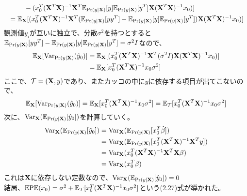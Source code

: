 \documentclass{jsarticle}
\begin{document}
\begin{enumerate}
\begin{align*}
&\ \ \ \ \ \ \ -(x_0^T ({\bf X}^T{\bf X})^{-1}{\bf X}^T\mathbb{E}_{\Pr(y|{\bf X})}[y]\mathbb{E}_{\Pr(y|{\bf X})}[y^T]{\bf X}({\bf X}^T{\bf X})^{-1}x_0)]\\
&=\mathbb{E}_{{\bf X}}[(x_0^T ({\bf X}^T{\bf X})^{-1}{\bf X}^T(\mathbb{E}_{\Pr(y|{\bf X})}[yy^T]-\mathbb{E}_{\Pr(y|{\bf X})}[y]\mathbb{E}_{\Pr(y|{\bf X})}[y^T]){\bf X}({\bf X}^T{\bf X})^{-1}x_0)]
\end{align*}
観測値$y_i$が互いに独立で、分散$\sigma^2$を持つとすると$\mathbb{E}_{\Pr(y|{\bf X})}[yy^T]-\mathbb{E}_{\Pr(y|{\bf X})}[y]\mathbb{E}_{\Pr(y|{\bf X})}[y^T]=\sigma^2 I$なので、
\begin{align*}
\mathbb{E}_{{\bf X}}[{\rm Var}_{\Pr(y|{\bf X})}(\hat{y}_0)]&=\mathbb{E}_{{\bf X}}[(x_0^T ({\bf X}^T{\bf X})^{-1}{\bf X}^T(\sigma^2 I){\bf X}({\bf X}^T{\bf X})^{-1}x_0)]\\
&=\mathbb{E}_{{\bf X}}[x_0^T ({\bf X}^T{\bf X})^{-1}x_0\sigma^2]
\end{align*}
ここで、${\cal T}=({\bf X},y)$であり、またカッコの中に$y$に依存する項目が出てこないので、
\[\mathbb{E}_{{\bf X}}[{\rm Var}_{\Pr(y|{\bf X})}(\hat{y}_0)]=\mathbb{E}_{{\bf X}}[x_0^T ({\bf X}^T{\bf X})^{-1}x_0\sigma^2]=\mathbb{E}_{\cal T}[x_0^T ({\bf X}^T{\bf X})^{-1}x_0\sigma^2]\]
次に、${\rm Var}_{{\bf X}}(\mathbb{E}_{\Pr(y|{\bf X})}[\hat{y}_0])$を計算していく。
\begin{align*}
{\rm Var}_{{\bf X}}(\mathbb{E}_{\Pr(y|{\bf X})}[\hat{y}_0])&={\rm Var}_{{\bf X}}(\mathbb{E}_{\Pr(y|{\bf X})}[x_0^T\hat{\beta}])\\
&={\rm Var}_{{\bf X}}(\mathbb{E}_{\Pr(y|{\bf X})}[x_0^T({\bf X}^T{\bf X})^{-1}{\bf X}^Ty])\\
&={\rm Var}_{{\bf X}}(x_0^T({\bf X}^T{\bf X})^{-1}{\bf X}^T{\bf X}\beta)\\
&={\rm Var}_{{\bf X}}(x_0^T\beta)
\end{align*}
これは${\bf X}$に依存しない定数なので、${\rm Var}_{{\bf X}}(\mathbb{E}_{\Pr(y|{\bf X})}[\hat{y}_0])=0$
\\
結局、${\rm EPE}(x_0)=\sigma^2+\mathbb{E}_{\cal T}[x_0^T ({\bf X}^T{\bf X})^{-1}x_0\sigma^2]$という(2.27)式が導かれた。





\end{enumerate}
\end{document}
